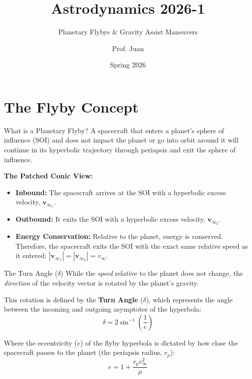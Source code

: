 \documentclass[11pt]{beamer}
\title[Gravity Assists \& Flybys]{Astrodynamics 2026-1}
\subtitle{Planetary Flybys \& Gravity Assist Maneuvers}
\author{Prof. Juan}
\institute{Universidad de Antioquia - Aerospace Engineering}
\date{Spring 2026}
\begin{document}
\begin{frame}
    \titlepage
\end{frame}

\section{The Flyby Concept}

\begin{frame}{What is a Planetary Flyby?}
    A spacecraft that enters a planet's sphere of influence (SOI) and does not impact the planet or go into orbit around it will continue in its hyperbolic trajectory through periapsis and exit the sphere of influence.
    
    \vspace{0.3cm}
    \textbf{The Patched Conic View:}
    \begin{itemize}
        \item \textbf{Inbound:} The spacecraft arrives at the SOI with a hyperbolic excess velocity, $\bm{v}_{\infty_1}$.
        \item \textbf{Outbound:} It exits the SOI with a hyperbolic excess velocity, $\bm{v}_{\infty_2}$.
        \item \textbf{Energy Conservation:} Relative to the planet, energy is conserved. Therefore, the spacecraft exits the SOI with the exact same relative speed as it entered: $|\bm{v}_{\infty_1}| = |\bm{v}_{\infty_2}| = v_\infty$.
    \end{itemize}
\end{frame}

\begin{frame}{The Turn Angle ($\delta$)}
    While the \textit{speed} relative to the planet does not change, the \textit{direction} of the velocity vector is rotated by the planet's gravity.
    
    \vspace{0.3cm}
    This rotation is defined by the \textbf{Turn Angle} ($\delta$), which represents the angle between the incoming and outgoing asymptotes of the hyperbola:
    \begin{equation}
        \delta = 2 \sin^{-1}\left(\frac{1}{e}\right)
    \end{equation}
    
    Where the eccentricity ($e$) of the flyby hyperbola is dictated by how close the spacecraft passes to the planet (the periapsis radius, $r_p$):
    \begin{equation}
        e = 1 + \frac{r_p v_\infty^2}{\mu}
    \end{equation}
   
\end{frame}
\end{document}
